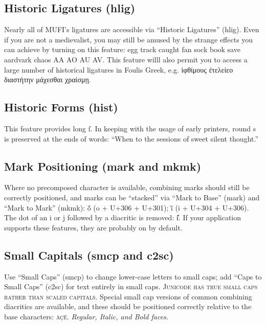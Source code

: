 \documentclass[12pt,a4paper,openany]{book}
\newcommand{\salt}[1]{{\addfontfeatures{Alternate=0}{#1}}}
\begin{document}
\subsection*{Historic Ligatures (hlig)}

Nearly all of MUFI’s ligatures are
accessible via “Historic Ligatures” (hlig).
{Even if you are not a medievalist,
  you may still be amused by the strange effects you can achieve by
  turning on this feature: egg track caught fan sock book save aardvark
  chaos AA AO
  AU AV.} This feature willl also permit you to access a large number
of historical ligatures in Foulis Greek, e.g.
{\greekfont{}ἰφθίμους
  ἐτελείε\salt{τ}ο
  διαστήτην μάχεσθαι χραίσμῃ.}

\subsection*{Historic Forms (hist)}

This feature provides long ſ. In keeping with the usage of early printers, round s is preserved
at the ends of words: {“When to the sessions of sweet silent thought.”}

\subsection*{Mark Positioning (mark and mkmk)}

Where no precomposed character is available, combining marks should
still be correctly positioned, and marks can be “stacked” via “Mark
to Base” (mark) and “Mark to Mark” (mkmk): ŏ́ (o + U+306 + U+301);
ī̆ (i + U+304 + U+306).  The dot of an i or j followed by a diacritic
is removed: i̽. If your application supports these
features, they are probably on by default.

\subsection*{Small Capitals (smcp and c2sc)}

Use “Small Caps” (smcp) to change lower-case letters to small caps;
add “Caps to Small Caps” (c2sc) for text entirely in small
caps. {\scshape Junicode has true small caps rather than scaled
  capitals.} Special small cap versions of common combining diacritics
are available, and these should be positioned correctly relative to
the base characters: {\scshape äçé}. {\itshape Regular, Italic, and
  Bold faces.}
\end{document}

